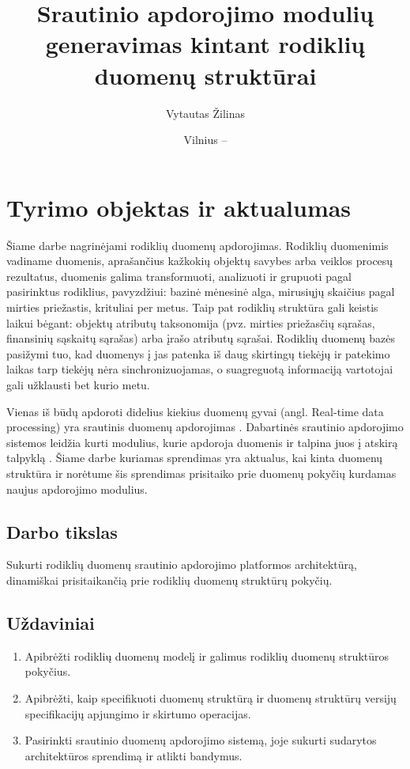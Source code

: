 \documentclass{VUMIFPSbakalaurinis}
\title{Srautinio apdorojimo modulių generavimas kintant rodiklių duomenų struktūrai}
\author{Vytautas Žilinas}
\date{Vilnius – \the\year}
\begin{document}
 
\maketitle

\cleardoublepage{}
\setcounter{page}{2}

\section{Tyrimo objektas ir aktualumas}
Šiame darbe nagrinėjami rodiklių duomenų apdorojimas. Rodiklių duomenimis vadiname duomenis, aprašančius kažkokių objektų savybes arba veiklos procesų rezultatus, 
duomenis galima transformuoti, analizuoti ir grupuoti pagal pasirinktus rodiklius, 
pavyzdžiui: bazinė mėnesinė alga, mirusiųjų skaičius pagal mirties priežastis, krituliai per metus. Taip pat rodiklių struktūra gali keistis laikui bėgant: 
objektų atributų taksonomija (pvz. mirties priežasčių sąrašas, finansinių sąskaitų sąrašas) arba įrašo atributų sąrašai.
Rodiklių duomenų bazės pasižymi tuo, kad duomenys į jas patenka iš daug skirtingų tiekėjų ir patekimo laikas tarp tiekėjų nėra 
sinchronizuojamas, o suagreguotą informaciją vartotojai gali užklausti bet kurio metu.  \par
Vienas iš būdų apdoroti didelius kiekius duomenų gyvai (angl. Real-time data processing) yra srautinis duomenų apdorojimas \cite{BigData, StreamProcessingInData}. 
Dabartinės srautinio apdorojimo sistemos leidžia kurti modulius, kurie apdoroja duomenis ir talpina juos į atskirą talpyklą \cite{8Requirements}. 
Šiame darbe kuriamas sprendimas yra aktualus, kai kinta duomenų struktūra ir norėtume šis sprendimas prisitaiko 
prie duomenų pokyčių kurdamas naujus apdorojimo modulius.

\subsection{Darbo tikslas}
Sukurti rodiklių duomenų srautinio apdorojimo platformos architektūrą, dinamiškai prisitaikančią prie rodiklių duomenų struktūrų pokyčių.

\subsection{Uždaviniai}
\begin{enumerate}
    \item Apibrėžti rodiklių duomenų modelį ir galimus rodiklių duomenų struktūros pokyčius.
    \item Apibrėžti, kaip specifikuoti duomenų struktūrą ir duomenų struktūrų versijų specifikacijų apjungimo ir skirtumo operacijas.
    \item Pasirinkti srautinio duomenų apdorojimo sistemą, joje sukurti sudarytos architektūros sprendimą ir atlikti bandymus.
\end{enumerate}
\end{document}
